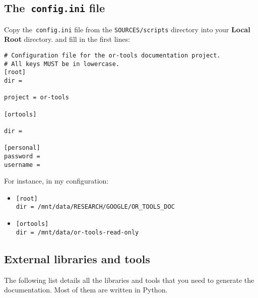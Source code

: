 \documentclass[a4paper,10pt]{article}
\newcommand{\code}[1]{\texttt{#1}}
\begin{document}
\subsection{The~\code{config.ini} file}

Copy the~\code{config.ini} file from the \code{SOURCES/scripts} directory into your {\bf Local Root} directory. and fill in 
the first lines:

\begin{verbatim}
# Configuration file for the or-tools documentation project.
# All keys MUST be in lowercase.
[root]
dir = 

project = or-tools

[ortools]

dir = 

[personal]
password = 
username = 
\end{verbatim}

For instance, in my configuration:

\begin{itemize}
\item \code{[root]}\\ \code{dir = /mnt/data/RESEARCH/GOOGLE/OR\_TOOLS\_DOC}
\item \code{[ortools]}\\\code{dir = /mnt/data/or-tools-read-only}
\end{itemize}

\subsection{External libraries and tools}

The following list details all the libraries and tools that you need to generate the documentation. Most of them are written in Python.
\end{document}
